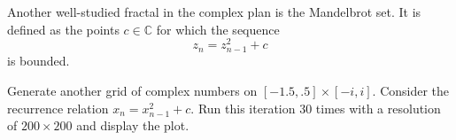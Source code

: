 Another well-studied fractal in the complex plan is the Mandelbrot set.
It is defined as the points $c \in \mathbb{C}$ for which the sequence
\[z_n = z_{n-1}^2 + c\]
is bounded.

\begin{problem}
Generate another grid of complex numbers on $[-1.5,.5]\times[-i,i]$.
Consider the recurrence relation $x_n = x_{n-1}^2 + c$.
Run this iteration 30 times with a resolution of $200 \times 200$ and display the plot.
\end{problem}
